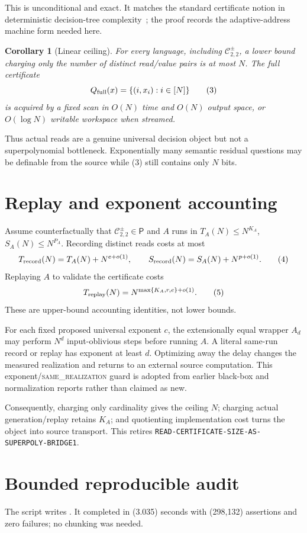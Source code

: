 \documentclass[11pt]{article}
\newtheorem{corollary}{Corollary}
\newcommand{\Core}{\mathcal C_{2,2}^{\pm}}
\newcommand{\same}{\textsc{same\_realization}}
\begin{document}
This is unconditional and exact.  It matches the standard certificate notion
in deterministic decision-tree complexity~\cite{BdW02}; the proof records the
adaptive-address machine form needed here.

\begin{corollary}[Linear ceiling]
For every language, including \(\Core\), a lower bound charging only the
number of distinct read/value pairs is at most \(N\).  The full certificate
\[
 Q_{\rm full}(x)=\{(i,x_i):i\in[N]\}                        \tag{3}
\]
is acquired by a fixed scan in \(O(N)\) time and \(O(N)\) output space, or
\(O(\log N)\) writable workspace when streamed.
\end{corollary}

Thus actual reads are a genuine universal decision object but not a
superpolynomial bottleneck.  Exponentially many semantic residual questions
may be definable from the source while (3) still contains only \(N\) bits.

\section{Replay and exponent accounting}
Assume counterfactually that \(\Core\in\mathsf P\) and \(A\) runs in
\(T_A(N)\le N^{K_A}\), \(S_A(N)\le N^{P_A}\).  Recording distinct reads costs
at most
\[
 T_{\rm record}(N)=T_A(N)+N^{e+o(1)},\qquad
 S_{\rm record}(N)=S_A(N)+N^{p+o(1)}.                       \tag{4}
\]
Replaying \(A\) to validate the certificate costs
\[
 T_{\rm replay}(N)=N^{\max\{K_A,r,e\}+o(1)}.                \tag{5}
\]
These are upper-bound accounting identities, not lower bounds.

For each fixed proposed universal exponent \(c\), the extensionally equal
wrapper \(A_d\) may perform \(N^d\) input-oblivious steps before running \(A\).
A literal same-run record or replay has exponent at least \(d\).  Optimizing
away the delay changes the measured realization and returns to an external
source computation.  This exponent/\same{} guard is adopted from earlier
black-box and normalization reports rather than claimed as new.

Consequently, charging only cardinality gives the ceiling \(N\); charging
actual generation/replay retains \(K_A\); and quotienting implementation cost
turns the object into source transport.  This retires
\texttt{READ-CERTIFICATE-SIZE-AS-SUPERPOLY-BRIDGE1}.

\section{Bounded reproducible audit}
The script 
writes .
It completed in (3.035) seconds with (298{,}132) assertions and zero
failures; no chunking was needed.
\end{document}
